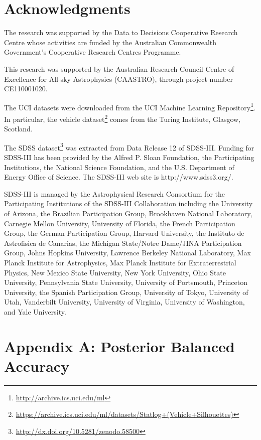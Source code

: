 \documentclass[fleqn,10pt,lineno]{wlpeerj} %
\begin{document}
\section{Acknowledgments}

The research was supported by the Data to Decisions Cooperative Research
Centre whose activities are funded by the Australian Commonwealth Government’s
Cooperative Research Centres Programme.

This research was supported by the Australian Research Council Centre of
Excellence for All-sky Astrophysics (CAASTRO), through project number
CE110001020.

The UCI datasets were downloaded from the UCI Machine Learning
Repository\footnote{\url{http://archive.ics.uci.edu/ml}}. In particular, the
vehicle
dataset\footnote{\url{https://archive.ics.uci.edu/ml/datasets/Statlog+(Vehicle+Silhouettes)}}
comes from the Turing Institute, Glasgow, Scotland.

The SDSS dataset\footnote{\url{http://dx.doi.org/10.5281/zenodo.58500}} was
extracted from Data Release 12 of SDSS-III. Funding for SDSS-III has been
provided by the Alfred P. Sloan Foundation, the Participating Institutions, the
National Science Foundation, and the U.S. Department of Energy Office of
Science. The SDSS-III web site is http://www.sdss3.org/.

SDSS-III is managed by the Astrophysical Research Consortium for the
Participating Institutions of the SDSS-III Collaboration including the
University of Arizona, the Brazilian Participation Group, Brookhaven National
Laboratory, Carnegie Mellon University, University of Florida, the French
Participation Group, the German Participation Group, Harvard University, the
Instituto de Astrofisica de Canarias, the Michigan State/Notre Dame/JINA
Participation Group, Johns Hopkins University, Lawrence Berkeley National
Laboratory, Max Planck Institute for Astrophysics, Max Planck Institute for
Extraterrestrial Physics, New Mexico State University, New York University,
Ohio State University, Pennsylvania State University, University of Portsmouth,
Princeton University, the Spanish Participation Group, University of Tokyo,
University of Utah, Vanderbilt University, University of Virginia, University
of Washington, and Yale University.





\pagebreak

\section*{Appendix A: Posterior Balanced Accuracy}
\end{document}
